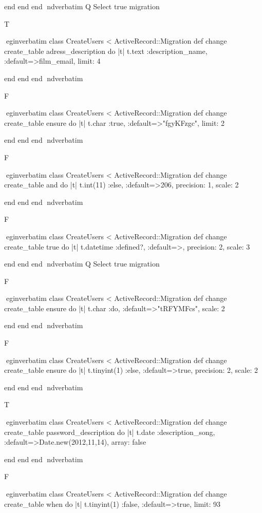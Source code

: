     end 
  end 
end
nd{verbatim}
Q
 Select true migration

T

egin{verbatim}
 class CreateUsers < ActiveRecord::Migration 
  def change 
    create_table adress_description do |t| 
      t.text :description_name, :default=>film_email, limit: 4
    
    end 
  end 
end
nd{verbatim}

F

egin{verbatim}
 class CreateUsers < ActiveRecord::Migration 
  def change 
    create_table ensure do |t| 
      t.char :true, :default=>"fgyKFzgc", limit: 2
    
    end 
  end 
end
nd{verbatim}

F

egin{verbatim}
 class CreateUsers < ActiveRecord::Migration 
  def change 
    create_table and do |t| 
      t.int(11) :else, :default=>206, precision: 1, scale: 2
    
    end 
  end 
end
nd{verbatim}

F

egin{verbatim}
 class CreateUsers < ActiveRecord::Migration 
  def change 
    create_table true do |t| 
      t.datetime :defined?, :default=>, precision: 2, scale: 3
    
    end 
  end 
end
nd{verbatim}
Q
 Select true migration

F

egin{verbatim}
 class CreateUsers < ActiveRecord::Migration 
  def change 
    create_table ensure do |t| 
      t.char :do, :default=>"tRFYMFcs", scale: 2
    
    end 
  end 
end
nd{verbatim}

F

egin{verbatim}
 class CreateUsers < ActiveRecord::Migration 
  def change 
    create_table ensure do |t| 
      t.tinyint(1) :else, :default=>true, precision: 2, scale: 2
    
    end 
  end 
end
nd{verbatim}

T

egin{verbatim}
 class CreateUsers < ActiveRecord::Migration 
  def change 
    create_table password_description do |t| 
      t.date :description_song, :default=>Date.new(2012,11,14), array: false
    
    end 
  end 
end
nd{verbatim}

F

egin{verbatim}
 class CreateUsers < ActiveRecord::Migration 
  def change 
    create_table when do |t| 
      t.tinyint(1) :false, :default=>true, limit: 93
    
